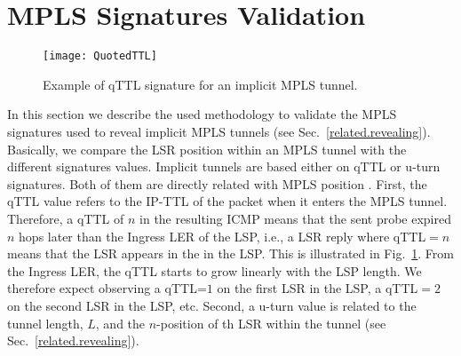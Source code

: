 \section{MPLS Signatures Validation}\label{validation}
\begin{figure}[!t]
  \begin{center}
    \texttt{[image: QuotedTTL]}
  \end{center}
  \caption{Example of qTTL signature for an implicit MPLS tunnel.}
  \label{validation.qTTLFig}
\end{figure}

In this section we describe the used methodology to validate the MPLS signatures
used to reveal implicit MPLS tunnels (see Sec.~\ref{related.revealing}).
Basically, we compare the LSR position within an MPLS tunnel with the different
signatures values. Implicit tunnels are based either on qTTL or u-turn
signatures. Both of them are directly related with MPLS position .
First, the qTTL value refers to the IP-TTL of the \echorequest packet when it
enters the MPLS tunnel.  Therefore, a qTTL of $n$ in the resulting ICMP
\ttlexceeded means that the sent probe expired $n$ hops later than the Ingress
LER of the LSP, i.e., a LSR reply where qTTL$=n$ means that the LSR appears in
the  in the LSP.  This is illustrated in
Fig.~\ref{validation.qTTLFig}.  From the Ingress LER, the qTTL starts to grow
linearly with the LSP length.  We therefore expect observing a qTTL=$1$ on the
first LSR in the LSP, a qTTL$=2$ on the second LSR in the LSP, etc.  Second, a
u-turn value is related to the tunnel length, $L$, and the $n$-position of th
LSR within the tunnel (see Sec.~\ref{related.revealing}).

